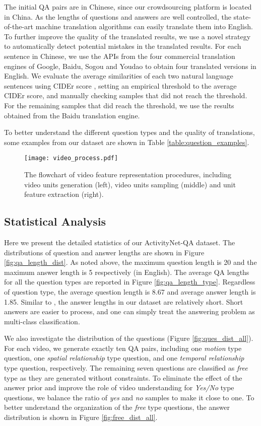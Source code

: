 \documentclass[letterpaper]{article} \usepackage{aaai19}  \usepackage{times}  \usepackage{helvet}  \usepackage{courier}  \usepackage{url}  \usepackage{graphicx}  \usepackage{amsfonts}
\begin{document}
The initial QA pairs are in Chinese, since our crowdsourcing platform is located in China. As the lengths of questions and answers are well controlled, the state-of-the-art machine translation algorithms can easily translate them into English. To further improve the quality of the translated results, we use a novel strategy to automatically detect potential mistakes in the translated results. For each sentence in Chinese, we use the APIs from the four commercial translation engines of Google, Baidu, Sogou and Youdao to obtain four translated versions in English. We evaluate the average similarities of each two natural language sentences using CIDEr score \cite{vedantam2015cider}, setting an empirical threshold to the average CIDEr score, and manually checking samples that did not reach the threshold. For the remaining samples that did reach the threshold, we use the results obtained from the Baidu translation engine.

To better understand the different question types and the quality of translations, some examples from our dataset are shown in Table \ref{table:question_examples}.

\begin{figure*}
\centering
\texttt{[image: video\_process.pdf]}
\caption{The flowchart of video feature representation procedures, including video units generation (left), video units sampling (middle) and unit feature extraction (right). }
\label{fig:flowchart}
\end{figure*}

\subsection{Statistical Analysis}
Here we present the detailed statistics of our ActivityNet-QA dataset. The distributions of question and answer lengths are shown in Figure \ref{fig:qa_length_dist}. As noted above, the maximum question length is 20 and the maximum answer length is 5 respectively (in English). The average QA lengths for all the question types are reported in Figure \ref{fig:qa_length_type}. Regardless of question type, the average question length is 8.67 and average answer length is 1.85. Similar to \cite{antol2015vqa}, the answer lengths in our dataset are relatively short. Short answers are easier to process, and one can simply treat the answering problem as multi-class classification.

We also investigate the distribution of the questions (Figure \ref{fig:ques_dist_all}). For each video, we generate exactly ten QA pairs, including one \emph{motion} type question, one \emph{spatial relationship} type question, and one \emph{temporal relationship} type question, respectively. The remaining seven questions are classified as \emph{free} type as they are generated without constraints.
To eliminate the effect of the answer prior and improve the role of video understanding for \emph{Yes/No} type questions, we balance the ratio of \emph{yes} and \emph{no} samples to make it close to one.
To better understand the organization of the \emph{free} type questions, the answer distribution is shown in Figure \ref{fig:free_dist_all}.
\end{document}
